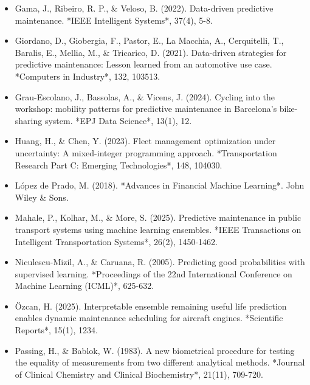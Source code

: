 \documentclass[10pt,a4paper,journal]{article}
\begin{document}
\begin{itemize}
\item Gama, J., Ribeiro, R. P., \& Veloso, B. (2022). Data-driven predictive maintenance. *IEEE Intelligent Systems*, 37(4), 5-8.
\end{itemize}
\begin{itemize}
\item Giordano, D., Giobergia, F., Pastor, E., La Macchia, A., Cerquitelli, T., Baralis, E., Mellia, M., \& Tricarico, D. (2021). Data-driven strategies for predictive maintenance: Lesson learned from an automotive use case. *Computers in Industry*, 132, 103513.
\end{itemize}
\begin{itemize}
\item Grau-Escolano, J., Bassolas, A., \& Vicens, J. (2024). Cycling into the workshop: mobility patterns for predictive maintenance in Barcelona’s bike-sharing system. *EPJ Data Science*, 13(1), 12.
\end{itemize}
\begin{itemize}
\item Huang, H., \& Chen, Y. (2023). Fleet management optimization under uncertainty: A mixed-integer programming approach. *Transportation Research Part C: Emerging Technologies*, 148, 104030.
\end{itemize}
\begin{itemize}
\item López de Prado, M. (2018). *Advances in Financial Machine Learning*. John Wiley \& Sons.
\end{itemize}
\begin{itemize}
\item Mahale, P., Kolhar, M., \& More, S. (2025). Predictive maintenance in public transport systems using machine learning ensembles. *IEEE Transactions on Intelligent Transportation Systems*, 26(2), 1450-1462.
\end{itemize}
\begin{itemize}
\item Niculescu-Mizil, A., \& Caruana, R. (2005). Predicting good probabilities with supervised learning. *Proceedings of the 22nd International Conference on Machine Learning (ICML)*, 625-632.
\end{itemize}
\begin{itemize}
\item Özcan, H. (2025). Interpretable ensemble remaining useful life prediction enables dynamic maintenance scheduling for aircraft engines. *Scientific Reports*, 15(1), 1234.
\end{itemize}
\begin{itemize}
\item Passing, H., \& Bablok, W. (1983). A new biometrical procedure for testing the equality of measurements from two different analytical methods. *Journal of Clinical Chemistry and Clinical Biochemistry*, 21(11), 709-720.
\end{itemize}
\end{document}
